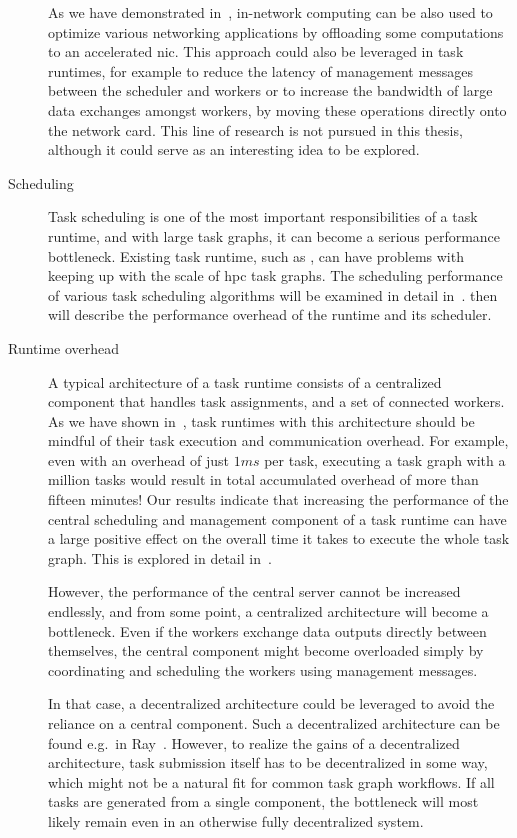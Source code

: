 \begin{description}
		As we have demonstrated in~\cite{pspin, spin2}, in-network computing can be also used to
		optimize various networking applications by offloading some computations to an accelerated
		\gls{nic}. This approach could also be leveraged in task runtimes, for example to
		reduce the latency of management messages between the scheduler and workers or to increase the
		bandwidth of large data exchanges amongst workers, by moving these operations directly onto the
		network card. This line of research is not pursued in this thesis, although it could serve as an
		interesting idea to be explored.
	\item[Scheduling] Task scheduling is one of the most important responsibilities of a task runtime, and with large
		task graphs, it can become a serious performance bottleneck. Existing task runtime, such as
		\dask{}, can have problems with keeping up with the scale of
		\gls{hpc} task graphs. The scheduling performance of various task scheduling
		algorithms will be examined in detail in~. 
		then will describe the performance overhead of the \dask{} runtime and its
		scheduler.
	\item[Runtime overhead] A typical architecture of a task runtime consists of a centralized component that handles task
		assignments, and a set of connected workers. As we have shown in~\cite{rsds}, task
		runtimes with this architecture should be mindful of their task execution and communication
		overhead. For example, even with an overhead of just $1ms$ per task, executing
		a task graph with a million tasks would result in total accumulated overhead of more than fifteen
		minutes! Our results indicate that increasing the performance of the central scheduling and
		management component of a task runtime can have a large positive effect on the overall time it
		takes to execute the whole task graph. This is explored in detail in~.

		However, the performance of the central server cannot be increased endlessly, and from some point,
		a centralized architecture will become a bottleneck. Even if the workers exchange data outputs
		directly between themselves, the central component might become overloaded simply by coordinating
		and scheduling the workers using management messages.

		In that case, a decentralized architecture could be leveraged to avoid the reliance on a central
		component. Such a decentralized architecture can be found e.g.\ in Ray~\cite{ray}.
		However, to realize the gains of a decentralized architecture, task submission itself has to be
		decentralized in some way, which might not be a natural fit for common task graph workflows. If all
		tasks are generated from a single component, the bottleneck will most likely remain even in an
		otherwise fully decentralized system.
\end{description}

